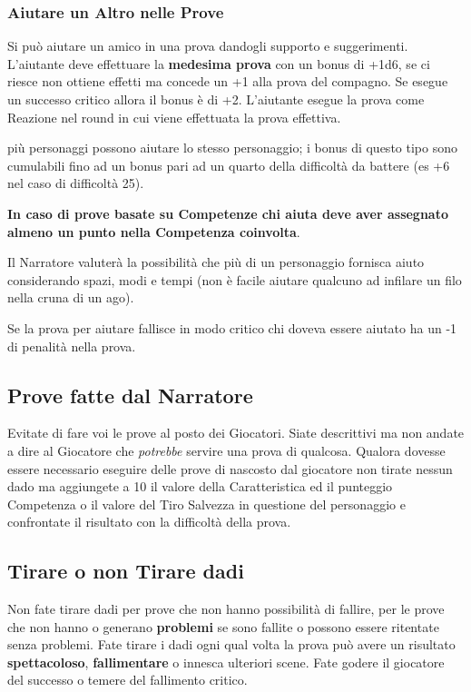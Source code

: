 \begin{multicols}{2}
\subsubsection{Aiutare un Altro nelle Prove}\label{aiutarealtro}

Si può aiutare un amico in una prova dandogli supporto e suggerimenti. L'aiutante deve effettuare la \textbf{medesima prova} con un bonus di +1d6, se ci riesce non ottiene effetti ma concede un +1 alla prova del compagno. Se esegue un successo critico allora il bonus è di +2. L'aiutante esegue la prova come Reazione nel round in cui viene effettuata la prova effettiva.

più personaggi possono aiutare lo stesso personaggio; i bonus di questo tipo sono cumulabili fino ad un bonus pari ad un quarto della difficoltà da battere (es +6 nel caso di difficoltà 25).

\textbf{In caso di prove basate su Competenze chi aiuta deve aver assegnato almeno un punto nella Competenza coinvolta}.

Il Narratore valuterà la possibilità che più di un personaggio fornisca aiuto considerando spazi, modi e tempi (non è facile aiutare qualcuno ad infilare un filo nella cruna di un ago).

Se la prova per aiutare fallisce in modo critico chi doveva essere aiutato ha un -1 di penalità nella prova.

\subsection{Prove fatte dal Narratore}\label{provefattedalnarratore}

Evitate di fare voi le prove al posto dei Giocatori. Siate descrittivi ma non andate a dire al Giocatore che \emph{potrebbe} servire una prova di qualcosa. Qualora dovesse essere necessario eseguire delle prove di nascosto dal giocatore non tirate nessun dado ma aggiungete a 10 il valore della Caratteristica ed il punteggio Competenza o il valore del Tiro Salvezza in questione del personaggio e confrontate il risultato con la difficoltà della prova.

\subsection{Tirare o non Tirare dadi}\label{tirarenontiraredadi}

Non fate tirare dadi per prove che non hanno possibilità di fallire, per le prove che non hanno o generano \textbf{problemi} se sono fallite o possono essere ritentate senza problemi. Fate tirare i dadi ogni qual volta la prova può avere un risultato \textbf{spettacoloso}, \textbf{fallimentare} o innesca ulteriori scene. Fate godere il giocatore del successo o temere del fallimento critico.


\end{multicols}

